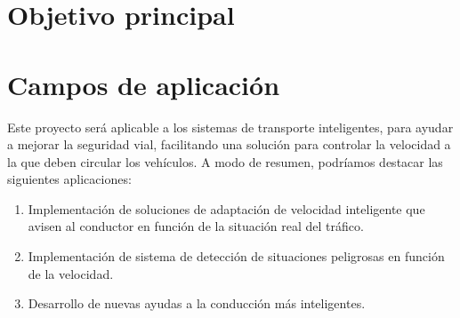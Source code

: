 \section{Objetivo principal}



\section{Campos de aplicación}


Este proyecto será aplicable a los sistemas de transporte inteligentes, para ayudar a mejorar la seguridad vial, facilitando una solución para controlar la velocidad a la que deben circular los vehículos. A modo de resumen, podríamos destacar las siguientes aplicaciones:
\begin{enumerate}	
	\item Implementación de soluciones de adaptación de velocidad inteligente que avisen al conductor en función de la situación real del tráfico.
	\item Implementación de sistema de detección de situaciones peligrosas en función de la velocidad.
	\item Desarrollo de nuevas ayudas a la conducción más inteligentes.
\end{enumerate}





